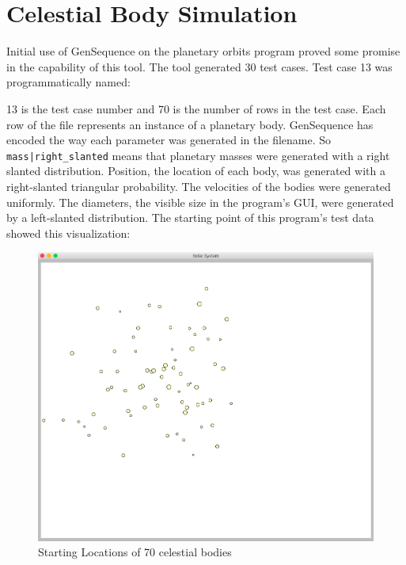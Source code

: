\section{Celestial Body Simulation}
Initial use of GenSequence on the planetary orbits program proved some promise in the capability of this tool. The tool generated 30 test cases. Test case 13 was programmatically named:
\vspace{1cm}

\noindent{}

\vspace{1cm}
13 is the test case number and 70 is the number of rows in the test case. Each row of the file represents an instance of a planetary body. GenSequence has encoded the way each parameter was generated in the filename. So \texttt{mass|right_slanted} means that planetary masses were generated with a right slanted distribution. Position, the location of each body, was generated with a right-slanted triangular probability. The velocities of the bodies were generated uniformly. The diameters, the visible size in the program's GUI, were generated by a left-slanted distribution. The starting point of this program's test data showed this visualization:

\begin{figure}[H]
\centering
\includegraphics[scale=0.4]{start-ex.png}
\caption{Starting Locations of 70 celestial bodies}
\label{fig:startbody}
\end{figure}

